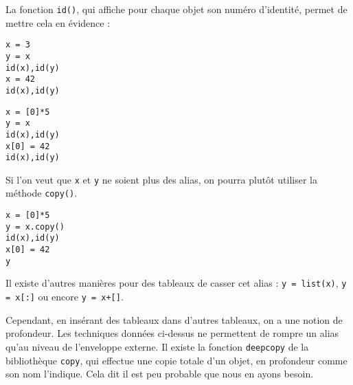La fonction \texttt{id()}, qui affiche pour chaque objet son \og numéro d'identité\fg, permet de 
mettre cela en évidence :
\begin{multicols}{2}
\begin{lstlisting}
x = 3
y = x
id(x),id(y)
x = 42
id(x),id(y)
\end{lstlisting}


\begin{lstlisting}
x = [0]*5
y = x
id(x),id(y)
x[0] = 42
id(x),id(y)
\end{lstlisting}

\end{multicols}
Si l'on veut que \texttt{x} et \texttt{y} ne soient plus des alias, on pourra plutôt utiliser la méthode 
\texttt{copy()}.

\begin{lstlisting}
x = [0]*5
y = x.copy()
id(x),id(y)
x[0] = 42
y
\end{lstlisting}

Il existe d'autres manières pour des tableaux de casser cet alias : \texttt{y = list(x)}, \texttt{y = 
x[:]} ou encore \texttt{y = x+[]}.

Cependant, en insérant des tableaux dans d'autres tableaux, on a une notion de \og profondeur\fg. Les 
techniques données ci-dessus ne permettent de rompre un alias qu'au niveau de l'enveloppe externe. 
Il existe la fonction \texttt{deepcopy} de la bibliothèque \texttt{copy}, qui effectue une copie totale 
d'un objet, en profondeur comme son nom l'indique. Cela dit il est peu probable que nous en ayons 
besoin.

